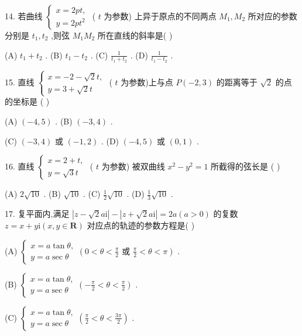\documentclass[10pt]{article}
\begin{document}
14. 若曲线 \(\left\{  \begin{array}{l} x = {2pt}, \\  y = {2p}{t}^{2} \end{array}\right.\) ( \(t\) 为参数) 上异于原点的不同两点 \({M}_{1},{M}_{2}\) 所对应的参数分别是 \({t}_{1},{t}_{2}\) ,则弦 \({M}_{1}{M}_{2}\) 所在直线的斜率是( )

(A) \({t}_{1} + {t}_{2}\) . (B) \({t}_{1} - {t}_{2}\) . (C) \(\frac{1}{{t}_{1} + {t}_{2}}\) . (D) \(\frac{1}{{t}_{1} - {t}_{2}}\) .

15. 直线 \(\left\{  \begin{array}{l} x =  - 2 - \sqrt{2}t, \\  y = 3 + \sqrt{2}t \end{array}\right.\) ( \(t\) 为参数)上与点 \(P\left( {-2,3}\right)\) 的距离等于 \(\sqrt{2}\) 的点的坐标是 ( )

(A) \(\left( {-4,5}\right)\) . (B) \(\left( {-3,4}\right)\) .

(C) \(\left( {-3,4}\right)\) 或 \(\left( {-1,2}\right)\) . (D) \(\left( {-4,5}\right)\) 或 \(\left( {0,1}\right)\) .

16. 直线 \(\left\{  \begin{array}{l} x = 2 + t, \\  y = \sqrt{3}t \end{array}\right.\) ( \(t\) 为参数) 被双曲线 \({x}^{2} - {y}^{2} = 1\) 所截得的弦长是 ( )

(A) \(2\sqrt{10}\) . (B) \(\sqrt{10}\) . (C) \(\frac{1}{2}\sqrt{10}\) . (D) \(\frac{1}{3}\sqrt{10}\) .

17. 复平面内,满足 \(\left| {z - \sqrt{2}a\mathrm{i}}\right|  - \left| {z + \sqrt{2}a\mathrm{i}}\right|  = {2a}\left( {a > 0}\right)\) 的复数 \(z = x + y\mathrm{i}\left( {x,y \in  \mathbf{R}}\right)\) 对应点的轨迹的参数方程是( )

(A) \(\left\{  {\begin{array}{l} x = a\tan \theta , \\  y = a\sec \theta  \end{array}\left( {0 < \theta  < \frac{\pi }{2}\text{ 或 }\frac{\pi }{2} < \theta  < \pi }\right) }\right.\) .

(B) \(\left\{  {\begin{array}{l} x = a\tan \theta , \\  y = a\sec \theta  \end{array}\left( {-\frac{\pi }{2} < \theta  < \frac{\pi }{2}}\right) }\right.\) .

(C) \(\left\{  {\begin{array}{l} x = a\tan \theta , \\  y = a\sec \theta  \end{array}\left( {\frac{\pi }{2} < \theta  < \frac{3\pi }{2}}\right) }\right.\) .
\end{document}
